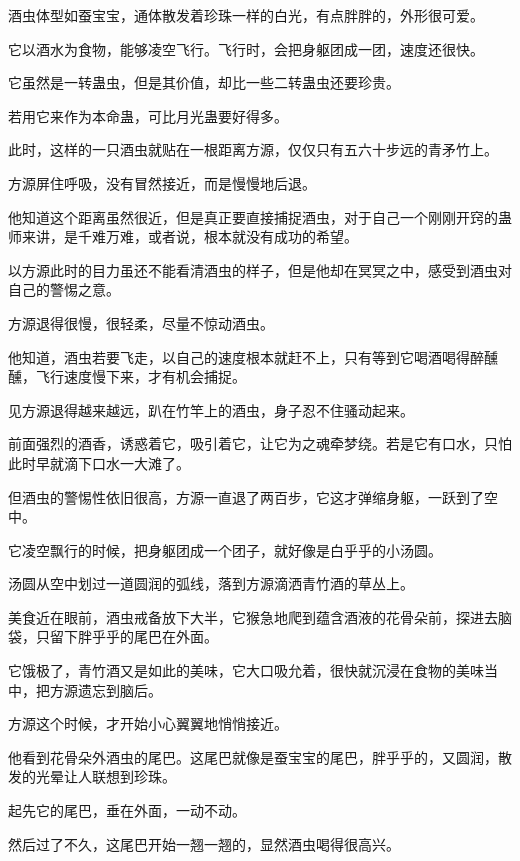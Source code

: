 
\begin{this_body}

酒虫体型如蚕宝宝，通体散发着珍珠一样的白光，有点胖胖的，外形很可爱。

它以酒水为食物，能够凌空飞行。飞行时，会把身躯团成一团，速度还很快。

它虽然是一转蛊虫，但是其价值，却比一些二转蛊虫还要珍贵。

若用它来作为本命蛊，可比月光蛊要好得多。

此时，这样的一只酒虫就贴在一根距离方源，仅仅只有五六十步远的青矛竹上。

方源屏住呼吸，没有冒然接近，而是慢慢地后退。

他知道这个距离虽然很近，但是真正要直接捕捉酒虫，对于自己一个刚刚开窍的蛊师来讲，是千难万难，或者说，根本就没有成功的希望。

以方源此时的目力虽还不能看清酒虫的样子，但是他却在冥冥之中，感受到酒虫对自己的警惕之意。

方源退得很慢，很轻柔，尽量不惊动酒虫。

他知道，酒虫若要飞走，以自己的速度根本就赶不上，只有等到它喝酒喝得醉醺醺，飞行速度慢下来，才有机会捕捉。

见方源退得越来越远，趴在竹竿上的酒虫，身子忍不住骚动起来。

前面强烈的酒香，诱惑着它，吸引着它，让它为之魂牵梦绕。若是它有口水，只怕此时早就滴下口水一大滩了。

但酒虫的警惕性依旧很高，方源一直退了两百步，它这才弹缩身躯，一跃到了空中。

它凌空飘行的时候，把身躯团成一个团子，就好像是白乎乎的小汤圆。

汤圆从空中划过一道圆润的弧线，落到方源滴洒青竹酒的草丛上。

美食近在眼前，酒虫戒备放下大半，它猴急地爬到蕴含酒液的花骨朵前，探进去脑袋，只留下胖乎乎的尾巴在外面。

它饿极了，青竹酒又是如此的美味，它大口吸允着，很快就沉浸在食物的美味当中，把方源遗忘到脑后。

方源这个时候，才开始小心翼翼地悄悄接近。

他看到花骨朵外酒虫的尾巴。这尾巴就像是蚕宝宝的尾巴，胖乎乎的，又圆润，散发的光晕让人联想到珍珠。

起先它的尾巴，垂在外面，一动不动。

然后过了不久，这尾巴开始一翘一翘的，显然酒虫喝得很高兴。


\end{this_body}
